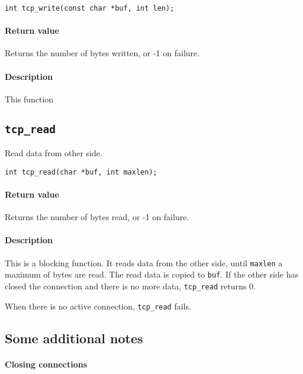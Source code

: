 \documentclass[11pt]{article}
\begin{document}
\begin{lstlisting}
int tcp_write(const char *buf, int len);
\end{lstlisting}

\paragraph{Return value}

Returns the number of bytes written, or -1 on failure.

\paragraph{Description}

This function 


\subsection{\lstinline{tcp_read}}

Read data from other side.

\begin{lstlisting}
int tcp_read(char *buf, int maxlen);
\end{lstlisting}

\paragraph{Return value}

Returns the number of bytes read, or -1 on failure.

\paragraph{Description}

This is a blocking function. It reads data from the other side, until
\lstinline|maxlen| a maximum of bytes are read. The read data is copied to
\lstinline|buf|. If the other side has closed the connection and there is no
more data, \lstinline|tcp_read| returns 0.

When there is no active connection, \lstinline|tcp_read| fails.


\subsection{Some additional notes}

\paragraph{Closing connections}
\end{document}

